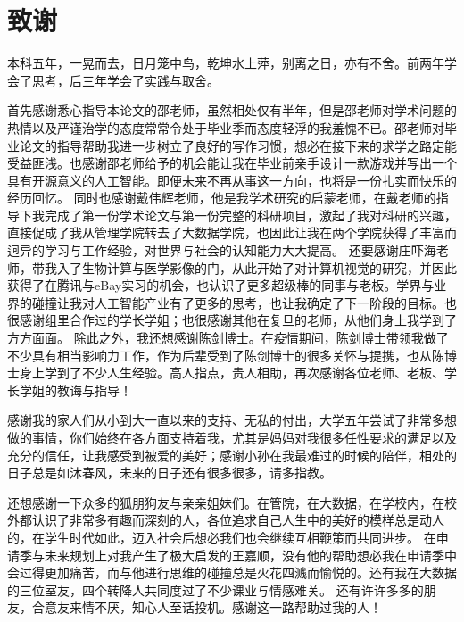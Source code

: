 \chapter*{致谢}
本科五年，一晃而去，日月笼中鸟，乾坤水上萍，别离之日，亦有不舍。前两年学会了思考，后三年学会了实践与取舍。

首先感谢悉心指导本论文的邵老师，虽然相处仅有半年，但是邵老师对学术问题的热情以及严谨治学的态度常常令处于毕业季而态度轻浮的我羞愧不已。邵老师对毕业论文的指导帮助我进一步树立了良好的写作习惯，想必在接下来的求学之路定能受益匪浅。也感谢邵老师给予的机会能让我在毕业前亲手设计一款游戏并写出一个具有开源意义的人工智能。即便未来不再从事这一方向，也将是一份扎实而快乐的经历回忆。
同时也感谢戴伟辉老师，他是我学术研究的启蒙老师，在戴老师的指导下我完成了第一份学术论文与第一份完整的科研项目，激起了我对科研的兴趣，直接促成了我从管理学院转去了大数据学院，也因此让我在两个学院获得了丰富而迥异的学习与工作经验，对世界与社会的认知能力大大提高。
还要感谢庄吓海老师，带我入了生物计算与医学影像的门，从此开始了对计算机视觉的研究，并因此获得了在腾讯与eBay实习的机会，也认识了更多超级棒的同事与老板。学界与业界的碰撞让我对人工智能产业有了更多的思考，也让我确定了下一阶段的目标。也很感谢组里合作过的学长学姐；也很感谢其他在复旦的老师，从他们身上我学到了方方面面。
除此之外，我还想感谢陈剑博士。在疫情期间，陈剑博士带领我做了不少具有相当影响力工作，作为后辈受到了陈剑博士的很多关怀与提携，也从陈博士身上学到了不少人生经验。高人指点，贵人相助，再次感谢各位老师、老板、学长学姐的教诲与指导！

感谢我的家人们从小到大一直以来的支持、无私的付出，大学五年尝试了非常多想做的事情，你们始终在各方面支持着我，尤其是妈妈对我很多任性要求的满足以及充分的信任，让我感受到被爱的美好；感谢小孙在我最难过的时候的陪伴，相处的日子总是如沐春风，未来的日子还有很多很多，请多指教。

还想感谢一下众多的狐朋狗友与亲亲姐妹们。在管院，在大数据，在学校内，在校外都认识了非常多有趣而深刻的人，各位追求自己人生中的美好的模样总是动人的，在学生时代如此，迈入社会后想必我们也会继续互相鞭策而共同进步。
在申请季与未来规划上对我产生了极大启发的王嘉顺，没有他的帮助想必我在申请季中会过得更加痛苦，而与他进行思维的碰撞总是火花四溅而愉悦的。还有我在大数据的三位室友，四个转降人共同度过了不少课业与情感难关。
还有许许多多的朋友，合意友来情不厌，知心人至话投机。感谢这一路帮助过我的人！
